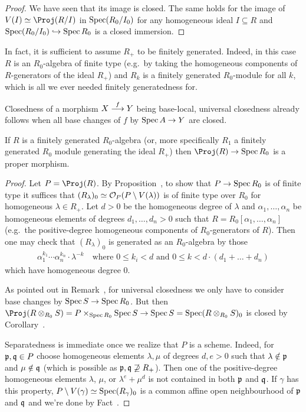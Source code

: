 \documentclass[a4paper,parskip=half,numbers=enddot, DIV=12]{scrreprt}
\begin{document}
\begin{proof}
    We have seen that its image is closed. The same holds for the image of $V(I) \simeq \Proj(R/I)$ in $\operatorname{Spec} (R_0/I_0)$ for any homogeneous ideal $I\subseteq R$ and $\Spec (R_0/I_0)\monomorphism \Spec R_0$ is a closed immersion.
\end{proof}
\begin{rem}
    In fact, it is sufficient to assume $R_+$ to be finitely generated. Indeed, in this case $R$ is an $R_0$-algebra of finite type (e.g.\ by taking the homogeneous components of $R$-generators of the ideal $R_+$) and $R_k$ is a finitely generated $R_0$-module for all $k$, which is all we ever needed finitely generatedness for.
\end{rem}
\begin{rem}
    Closedness of a morphism $X\morphism[f] Y$ being base-local, universal closedness already follows when all base changes of $f$ by $\Spec A \morphism Y$ are closed.
\end{rem}
\begin{cor}
    If $R$ is a finitely generated $R_0$-algebra (or, more specifically $R_1$ a finitely generated $R_0$ module generating the ideal $R_+$) then $\Proj(R)\morphism \Spec R_0$ is a proper morphism.
\end{cor}
\begin{proof}
	Let $P=\Proj(R)$. By Proposition~, to show that $P\morphism\Spec R_0$ is of finite type it suffices that $(R_\lambda)_0\simeq \mathcal{O}_P(P\setminus V(\lambda))$ is of finite type over $R_0$ for homogeneous $\lambda\in R_+$. Let $d>0$ be the homogeneous degree of $\lambda$ and  $\alpha_1,\ldots,\alpha_n$ be homogeneous elements of degrees $d_1,\ldots,d_n>0$ such that $R=R_0[\alpha_1,\ldots,\alpha_n]$ (e.g.\ the positive-degree homogeneous components of $R_0$-generators of $R$). Then one may check that $(R_\lambda)_0$ is generated as an $R_0$-algebra by those
	\begin{align*}
		\alpha_1^{k_1}\cdots \alpha_n^{k_n}\cdot\lambda^{-k}\quad\text{where }0\leq k_i<d\text{ and }0\leq k<d\cdot(d_1+\ldots+d_n)
	\end{align*}
	which have homogeneous degree $0$.
	
	As pointed out in Remark~, for universal closedness we only have to consider base changes by $\Spec S\morphism\Spec R_0$. But then $\Proj(R\otimes_{R_0}S)=P\times_{\Spec R_0}\Spec S\morphism\Spec S=\Spec (R\otimes_{R_0}S)_0$ is closed by Corollary~.
	
	Separatedness is immediate once we realize that $P$ is a scheme. Indeed, for $\mathfrak{p},\mathfrak{q}\in P$ choose homogeneous elements $\lambda,\mu$ of degrees $d,e>0$ such that $\lambda\notin\mathfrak{p}$ and $\mu\notin\mathfrak{q}$ (which is possible as $\mathfrak{p},\mathfrak{q}\not\supseteq R_+$). Then one of the positive-degree homogeneous elements $\lambda$, $\mu$, or $\lambda^e+\mu^d$ is not contained in both $\mathfrak{p}$ and $\mathfrak{q}$. If $\gamma$ has this property, $P\setminus V(\gamma)\simeq \operatorname{Spec} (R_\gamma)_0$ is a common affine open neighbourhood of $\mathfrak{p}$ and $\mathfrak{q}$ and we're done by Fact~.
\end{proof}
\end{document}
